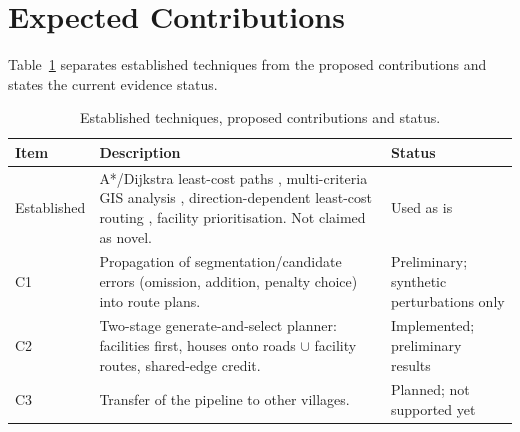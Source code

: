 \documentclass[12pt,a4paper]{report}
\begin{document}
\section{Expected Contributions}
Table~\ref{tab:contrib} separates established techniques from the proposed contributions and states the current evidence status.
\begin{table}[ht]\centering\small
\caption{Established techniques, proposed contributions and status.}\label{tab:contrib}
\begin{tabularx}{\textwidth}{@{}p{2.2cm}Xp{3.6cm}@{}}\toprule
Item & Description & Status\\\midrule
Established & A*/Dijkstra least-cost paths \cite{F01,F02}, multi-criteria GIS analysis \cite{F03}, direction-dependent least-cost routing \cite{F04}, facility prioritisation. Not claimed as novel. & Used as is\\
C1 & Propagation of segmentation/candidate errors (omission, addition, penalty choice) into route plans. & Preliminary; synthetic perturbations only\\
C2 & Two-stage generate-and-select planner: facilities first, houses onto roads $\cup$ facility routes, shared-edge credit. & Implemented; preliminary results\\
C3 & Transfer of the pipeline to other villages. & Planned; not supported yet\\\bottomrule
\end{tabularx}
\end{table}

\end{document}
